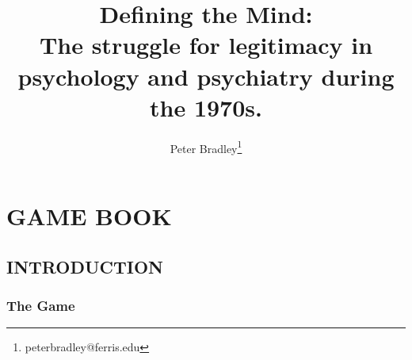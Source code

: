 \pagestyle{plain}



\setcounter{secnumdepth}{8}
\setcounter{tocdepth}{3}




\makeatother


\usepackage{makeidx}
\makeindex


\maketitle

\frontmatter{}\pagestyle{empty}






\pagebreak 

\part{GAME BOOK}
\label{gamebook}


\title{Defining the Mind:\protect\\
\large{The struggle for legitimacy in psychology and psychiatry during the 1970s.}}

\author[1]{Peter Bradley\thanks{peterbradley@ferris.edu}}

\maketitle
\newpage




\tableofcontents
\newpage
\listoftables
\newpage
\listoffigures
\newpage





\mainmatter


\pagebreak 

\chapter{INTRODUCTION}
\label{introduction}

\section{The Game}
\label{thegame}

